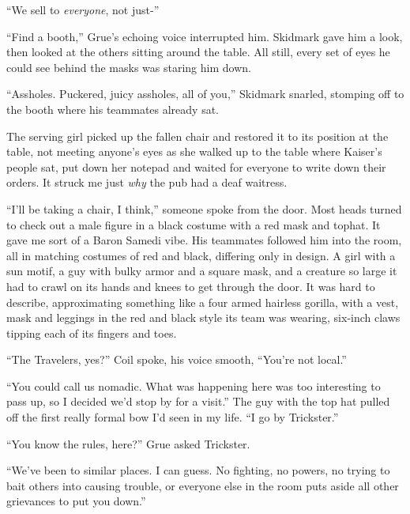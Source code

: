 ``We sell to \emph{everyone}, not just-''



``Find a booth,'' Grue's echoing voice interrupted him.  Skidmark gave him a look, then looked at the others sitting around the table.  All still, every set of eyes he could see behind the masks was staring him down.



``Assholes.  Puckered, juicy assholes, all of you,'' Skidmark snarled, stomping off to the booth where his teammates already sat.



The serving girl picked up the fallen chair and restored it to its position at the table, not meeting anyone's eyes as she walked up to the table where Kaiser's people sat, put down her notepad and waited for everyone to write down their orders.  It struck me just \emph{why} the pub had a deaf waitress.



``I'll be taking a chair, I think,'' someone spoke from the door.  Most heads turned to check out a male figure in a black costume with a red mask and tophat.  It gave me sort of a Baron Samedi vibe.  His teammates followed him into the room, all in matching costumes of red and black, differing only in design.  A girl with a sun motif, a guy with bulky armor and a square mask, and a creature so large it had to crawl on its hands and knees to get through the door.  It was hard to describe, approximating something like a four armed hairless gorilla, with a vest, mask and leggings in the red and black style its team was wearing, six-inch claws tipping each of its fingers and toes.



``The Travelers, yes?'' Coil spoke, his voice smooth, ``You're not local.''



``You could call us nomadic.  What was happening here was too interesting to pass up, so I decided we'd stop by for a visit.'' The guy with the top hat pulled off the first really formal bow I'd seen in my life. ``I go by Trickster.''



``You know the rules, here?'' Grue asked Trickster.



``We've been to similar places.  I can guess.  No fighting, no powers, no trying to bait others into causing trouble, or everyone else in the room puts aside all other grievances to put you down.''



